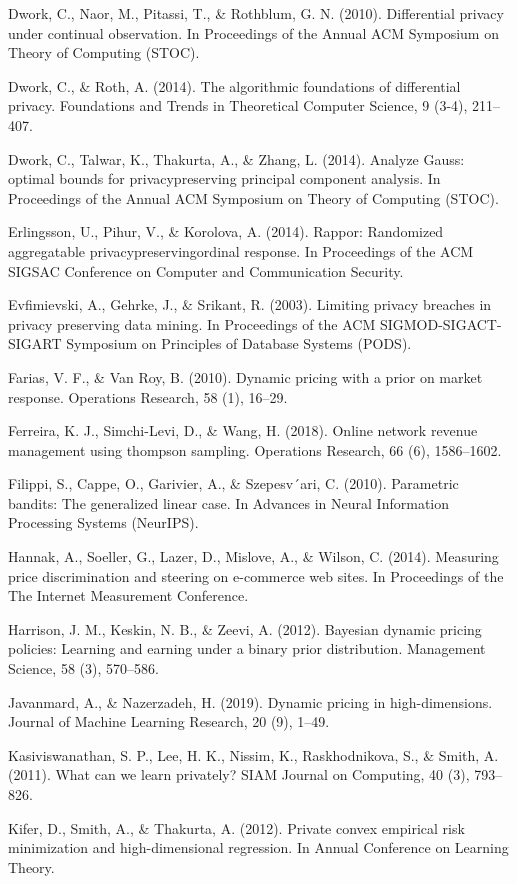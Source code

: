 Dwork, C., Naor, M., Pitassi, T., \& Rothblum, G. N. (2010). Differential privacy under continual observation. In Proceedings of the Annual ACM Symposium on Theory of Computing (STOC).

Dwork, C., \& Roth, A. (2014). The algorithmic foundations of differential privacy. Foundations and Trends in Theoretical Computer Science, 9 (3-4), 211--407.

Dwork, C., Talwar, K., Thakurta, A., \& Zhang, L. (2014). Analyze Gauss: optimal bounds for privacypreserving principal component analysis. In Proceedings of the Annual ACM Symposium on Theory of Computing (STOC).

Erlingsson, U., Pihur, V., \& Korolova, A. (2014). Rappor: Randomized aggregatable privacypreservingordinal response. In Proceedings of the ACM SIGSAC Conference on Computer and Communication Security.

Evfimievski, A., Gehrke, J., \& Srikant, R. (2003). Limiting privacy breaches in privacy preserving data mining. In Proceedings of the ACM SIGMOD-SIGACT-SIGART Symposium on Principles of Database Systems (PODS).

Farias, V. F., \& Van Roy, B. (2010). Dynamic pricing with a prior on market response. Operations Research, 58 (1), 16--29.

Ferreira, K. J., Simchi-Levi, D., \& Wang, H. (2018). Online network revenue management using thompson sampling. Operations Research, 66 (6), 1586--1602.

Filippi, S., Cappe, O., Garivier, A., \& Szepesv´ari, C. (2010). Parametric bandits: The generalized linear case. In Advances in Neural Information Processing Systems (NeurIPS).

Hannak, A., Soeller, G., Lazer, D., Mislove, A., \& Wilson, C. (2014). Measuring price discrimination and steering on e-commerce web sites. In Proceedings of the The Internet Measurement Conference.

Harrison, J. M., Keskin, N. B., \& Zeevi, A. (2012). Bayesian dynamic pricing policies: Learning and earning under a binary prior distribution. Management Science, 58 (3), 570--586.

Javanmard, A., \& Nazerzadeh, H. (2019). Dynamic pricing in high-dimensions. Journal of Machine Learning Research, 20 (9), 1--49.

Kasiviswanathan, S. P., Lee, H. K., Nissim, K., Raskhodnikova, S., \& Smith, A. (2011). What can we learn privately? SIAM Journal on Computing, 40 (3), 793--826.

Kifer, D., Smith, A., \& Thakurta, A. (2012). Private convex empirical risk minimization and high-dimensional regression. In Annual Conference on Learning Theory.

